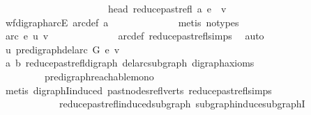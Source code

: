 \begin{isabellebody}
\ \ \ \ \ \ \ \ \ \ \ \ \ \ \ \ \ \ \ \ \ {\isasymand}\ head\ {\isacharparenleft}{\kern0pt}reduce{\isacharunderscore}{\kern0pt}past{\isacharunderscore}{\kern0pt}refl\ a{\isacharparenright}{\kern0pt}\ e\ {\isacharequal}{\kern0pt}\ v{\isachardoublequoteclose}\isanewline
\ \ \ \ \ \ \ \ \ \ \ \ \isamarkupfalse%
\ wf{\isacharunderscore}{\kern0pt}digraph{\isachardot}{\kern0pt}arcE\ arc{\isacharunderscore}{\kern0pt}def\ a\isanewline
\ \ \ \ \ \ \ \ \ \ \ \ \isamarkupfalse%
\ {\isacharparenleft}{\kern0pt}metis\ {\isacharparenleft}{\kern0pt}no{\isacharunderscore}{\kern0pt}types{\isacharparenright}{\kern0pt}{\isacharparenright}{\kern0pt}\ \isanewline
\ \ \ \ \ \ \ \ \ \ \isamarkupfalse%
\ \isamarkupfalse%
\ {\isachardoublequoteopen}arc\ e\ {\isacharparenleft}{\kern0pt}u{\isacharcomma}{\kern0pt}\ v{\isacharparenright}{\kern0pt}{\isachardoublequoteclose}\isanewline
\ \ \ \ \ \ \ \ \ \ \ \ \isamarkupfalse%
\ arc{\isacharunderscore}{\kern0pt}def\ reduce{\isacharunderscore}{\kern0pt}past{\isacharunderscore}{\kern0pt}refl{\isachardot}{\kern0pt}simps\ \isamarkupfalse%
\ auto\isanewline
\ \ \ \ \ \ \ \ \isamarkupfalse%
\isanewline
\ \ \ \ \ \ \isamarkupfalse%
\ {\isachardoublequoteopen}u\ {\isasymrightarrow}\isactrlsup {\isacharasterisk}{\kern0pt}\isactrlbsub pre{\isacharunderscore}{\kern0pt}digraph{\isachardot}{\kern0pt}del{\isacharunderscore}{\kern0pt}arc\ G\ e\isactrlesub \ v{\isachardoublequoteclose}\isanewline
\ \ \ \ \ \ \ \ \isamarkupfalse%
\ a\ b\ reduce{\isacharunderscore}{\kern0pt}past{\isacharunderscore}{\kern0pt}refl{\isacharunderscore}{\kern0pt}digraph\ del{\isacharunderscore}{\kern0pt}arc{\isacharunderscore}{\kern0pt}subgraph\ digraph{\isacharunderscore}{\kern0pt}axioms\isanewline
\ \ \ \ \ \ \ \ \ pre{\isacharunderscore}{\kern0pt}digraph{\isachardot}{\kern0pt}reachable{\isacharunderscore}{\kern0pt}mono\isanewline
\ \ \ \ \ \ \ \ \isamarkupfalse%
\ {\isacharparenleft}{\kern0pt}metis\ digraphI{\isacharunderscore}{\kern0pt}induced\ past{\isacharunderscore}{\kern0pt}nodes{\isacharunderscore}{\kern0pt}refl{\isacharunderscore}{\kern0pt}verts\ reduce{\isacharunderscore}{\kern0pt}past{\isacharunderscore}{\kern0pt}refl{\isachardot}{\kern0pt}simps\isanewline
\ \ \ \ \ \ \ \ \ \ \ \ reduce{\isacharunderscore}{\kern0pt}past{\isacharunderscore}{\kern0pt}refl{\isacharunderscore}{\kern0pt}induced{\isacharunderscore}{\kern0pt}subgraph\ subgraph{\isacharunderscore}{\kern0pt}induce{\isacharunderscore}{\kern0pt}subgraphI{\isacharparenright}{\kern0pt}\isanewline

\end{isabellebody}
